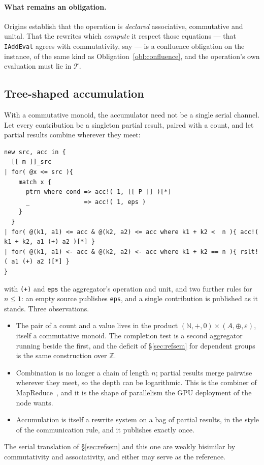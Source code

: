 \documentclass[11pt]{article}
\theoremstyle{branddef}
\theoremstyle{brandplain}
\theoremstyle{brandrem}
\begin{document}
\paragraph{What remains an obligation.} Origins establish that the operation is
\emph{declared} associative, commutative and unital. That the rewrites which
\emph{compute} it respect those equations --- that \texttt{IAddEval} agrees with
commutativity, say --- is a confluence obligation on the instance, of the same
kind as Obligation~\ref{obl:confluence}, and the operation's own evaluation must
lie in \(\mathcal{T}\).

\subsection{Tree-shaped accumulation}
\label{sec:tree}

With a commutative monoid, the accumulator need not be a single serial
channel. Let every contribution be a singleton partial result, paired with a
count, and let partial results combine wherever they meet:
\begin{lstlisting}
new src, acc in {
  [[ m ]]_src
| for( @x <= src ){
    match x {
      ptrn where cond => acc!( 1, [[ P ]] )[*]
      _               => acc!( 1, eps )
    }
  }
| for( @(k1, a1) <= acc & @(k2, a2) <= acc where k1 + k2 <  n ){ acc!(  k1 + k2, a1 (+) a2 )[*] }
| for( @(k1, a1) <- acc & @(k2, a2) <- acc where k1 + k2 == n ){ rslt!( a1 (+) a2 )[*] }
}
\end{lstlisting}
with \texttt{(+)} and \texttt{eps} the aggregator's operation and unit, and
two further rules for \(n \le 1\): an empty source publishes \texttt{eps}, and a
single contribution is published as it stands. Three observations.
\begin{itemize}[nosep]
\item The pair of a count and a value lives in the product
\((\mathbb{N},+,0)\times(A,\oplus,\varepsilon)\), itself a commutative monoid.
The completion test is a second aggregator running beside the first, and the
deficit of \S\ref{sec:refsem} for dependent groups is the same construction over
\(\mathbb{Z}\).
\item Combination is no longer a chain of length \(n\); partial results merge
pairwise wherever they meet, so the depth can be logarithmic. This is the
combiner of MapReduce~\cite{DeanGhemawat04}, and it is the shape of parallelism
the GPU deployment of the node wants.
\item Accumulation is itself a rewrite system on a bag of partial results, in
the style of the communication rule, and it publishes exactly once.
\end{itemize}
The serial translation of \S\ref{sec:refsem} and this one are weakly bisimilar
by commutativity and associativity, and either may serve as the reference.
\end{document}
